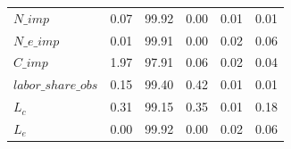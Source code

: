 \begin{center}
\begin{longtable}{lccccc}
$N\_imp             $	 & 	           0.07	 & 	          99.92	 & 	           0.00	 & 	           0.01	 & 	           0.01 \\ 
$N\_e\_imp          $	 & 	           0.01	 & 	          99.91	 & 	           0.00	 & 	           0.02	 & 	           0.06 \\ 
$C\_imp             $	 & 	           1.97	 & 	          97.91	 & 	           0.06	 & 	           0.02	 & 	           0.04 \\ 
$labor\_share\_obs  $	 & 	           0.15	 & 	          99.40	 & 	           0.42	 & 	           0.01	 & 	           0.01 \\ 
${L_c}              $	 & 	           0.31	 & 	          99.15	 & 	           0.35	 & 	           0.01	 & 	           0.18 \\ 
${L_e}              $	 & 	           0.00	 & 	          99.92	 & 	           0.00	 & 	           0.02	 & 	           0.06 \\ 
\end{longtable}
 \end{center}
